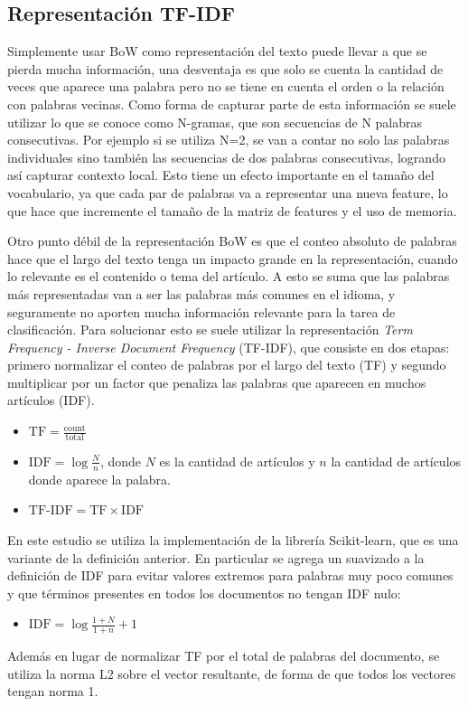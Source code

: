 \documentclass[11pt, a4paper]{article}
\begin{document}
\subsection{Representación TF-IDF}

Simplemente usar BoW como representación del texto puede llevar a que se pierda mucha información,
una desventaja es que solo se cuenta la cantidad de veces que aparece una palabra pero no se tiene
en cuenta el orden o la relación con palabras vecinas. Como forma de capturar parte de esta 
información se suele utilizar lo que se conoce como N-gramas, que son secuencias de N palabras 
consecutivas.
Por ejemplo si se utiliza N=2, se van a contar no solo las palabras individuales sino también 
las secuencias de dos palabras consecutivas, logrando así capturar contexto local.
Esto tiene un efecto importante en el tamaño del vocabulario, ya que cada par de palabras va 
a representar una nueva feature, lo que hace que incremente el tamaño de la matriz de features 
y el uso de memoria.

Otro punto débil de la representación BoW es que el conteo absoluto de palabras hace que el largo
del texto tenga un impacto grande en la representación, cuando lo relevante es el contenido o tema
del artículo. A esto se suma que las palabras más representadas van a ser las palabras más comunes
en el idioma, y seguramente no aporten mucha información relevante para la tarea de clasificación.
Para solucionar esto se suele utilizar la representación 
\textit{Term Frequency - Inverse Document Frequency} (TF-IDF), que consiste en dos etapas: 
primero normalizar el conteo de palabras por el largo del texto (TF) y segundo multiplicar 
por un factor que penaliza las palabras que aparecen en muchos artículos (IDF).

\begin{itemize}
    \item $\text{TF} = \frac{\text{count}}{\text{total}}$
    \item $\text{IDF} = \log \frac{N}{n}$, donde $N$ es la cantidad de artículos 
    y $n$ la cantidad de artículos donde aparece la palabra.
    \item $\text{TF-IDF} = \text{TF} \times \text{IDF}$
\end{itemize}

En este estudio se utiliza la implementación de la librería Scikit-learn, que es una 
variante de la definición anterior. En particular se agrega un suavizado a la definición 
de IDF para evitar valores extremos para palabras muy poco comunes y que términos 
presentes en todos los documentos no tengan IDF nulo:
\begin{itemize}
    \item $\text{IDF} = \log \frac{1+N}{1+n} + 1$
\end{itemize}
Además en lugar de normalizar TF por el total de palabras del documento, se utiliza la 
norma L2 sobre el vector resultante, de forma de que todos los vectores tengan norma 1. 
\end{document}
